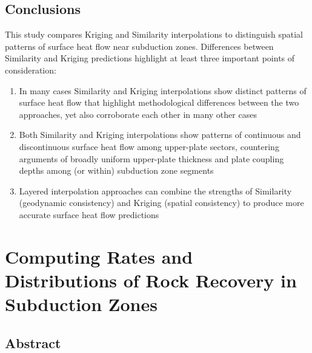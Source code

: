 \hypertarget{conclusions-1}{%
\section{Conclusions}\label{conclusions-1}}

This study compares Kriging and Similarity interpolations to distinguish spatial patterns of surface heat flow near subduction zones. Differences between Similarity and Kriging predictions highlight at least three important points of consideration:

\begin{enumerate}
\def\labelenumi{\arabic{enumi}.}
\tightlist
\item
  In many cases Similarity and Kriging interpolations show distinct patterns of surface heat flow that highlight methodological differences between the two approaches, yet also corroborate each other in many other cases
\item
  Both Similarity and Kriging interpolations show patterns of continuous and discontinuous surface heat flow among upper-plate sectors, countering arguments of broadly uniform upper-plate thickness and plate coupling depths among (or within) subduction zone segments
\item
  Layered interpolation approaches can combine the strengths of Similarity (geodynamic consistency) and Kriging (spatial consistency) to produce more accurate surface heat flow predictions
\end{enumerate}

\cleardoublepage

\hypertarget{chpt4}{%
\chapter{Computing Rates and Distributions of Rock Recovery in Subduction Zones}\label{chpt4}}


\hypertarget{chpt4Abstract}{%
\section{Abstract}\label{chpt4Abstract}}

